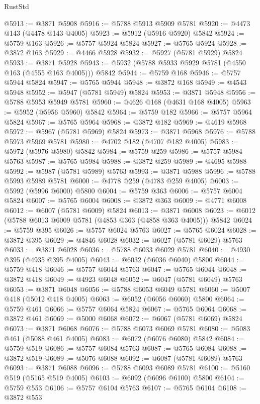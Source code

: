 \begin{lexlean}{RustStd}
\begin{coremodule}
@5913 := @3871 @5908
@5916 := @5788 @5913 @5909 @5781
@5920 := @4473 @143 (@4478 @143 @4005)
@5923 := @5912 (@5916 @5920) @5842
@5924 := @5759 @163
@5926 := @5757 @5924 @5824
@5927 := @5765 @5924
@5928 := @3872 @163
@5929 := @4466 @5928
@5932 := @5927 (@5781 @5929) @5824
@5933 := @3871 @5928
@5943 := @5932 (@5788 @5933 @5929 @5781 (@4550 @163 (@4555 @163 @4005))) @5842
@5944 := @5759 @168
@5946 := @5757 @5944 @5824
@5947 := @5765 @5944
@5948 := @3872 @168
@5949 := @4543 @5948
@5952 := @5947 (@5781 @5949) @5824
@5953 := @3871 @5948
@5956 := @5788 @5953 @5949 @5781
@5960 := @4626 @168 (@4631 @168 @4005)
@5963 := @5952 (@5956 @5960) @5842
@5964 := @5759 @182
@5966 := @5757 @5964 @5824
@5967 := @5765 @5964
@5968 := @3872 @182
@5969 := @4619 @5968
@5972 := @5967 (@5781 @5969) @5824
@5973 := @3871 @5968
@5976 := @5788 @5973 @5969 @5781
@5980 := @4702 @182 (@4707 @182 @4005)
@5983 := @5972 (@5976 @5980) @5842
@5984 := @5759 @259
@5986 := @5757 @5984 @5763
@5987 := @5765 @5984
@5988 := @3872 @259
@5989 := @4695 @5988
@5992 := @5987 (@5781 @5989) @5763
@5993 := @3871 @5988
@5996 := @5788 @5993 @5989 @5781
@6000 := @4778 @259 (@4783 @259 @4005)
@6003 := @5992 (@5996 @6000) @5800
@6004 := @5759 @363
@6006 := @5757 @6004 @5824
@6007 := @5765 @6004
@6008 := @3872 @363
@6009 := @4771 @6008
@6012 := @6007 (@5781 @6009) @5824
@6013 := @3871 @6008
@6023 := @6012 (@5788 @6013 @6009 @5781 (@4853 @363 (@4858 @363 @4005))) @5842
@6024 := @5759 @395
@6026 := @5757 @6024 @5763
@6027 := @5765 @6024
@6028 := @3872 @395
@6029 := @4846 @6028
@6032 := @6027 (@5781 @6029) @5763
@6033 := @3871 @6028
@6036 := @5788 @6033 @6029 @5781
@6040 := @4930 @395 (@4935 @395 @4005)
@6043 := @6032 (@6036 @6040) @5800
@6044 := @5759 @418
@6046 := @5757 @6044 @5763
@6047 := @5765 @6044
@6048 := @3872 @418
@6049 := @4923 @6048
@6052 := @6047 (@5781 @6049) @5763
@6053 := @3871 @6048
@6056 := @5788 @6053 @6049 @5781
@6060 := @5007 @418 (@5012 @418 @4005)
@6063 := @6052 (@6056 @6060) @5800
@6064 := @5759 @461
@6066 := @5757 @6064 @5824
@6067 := @5765 @6064
@6068 := @3872 @461
@6069 := @5000 @6068
@6072 := @6067 (@5781 @6069) @5824
@6073 := @3871 @6068
@6076 := @5788 @6073 @6069 @5781
@6080 := @5083 @461 (@5088 @461 @4005)
@6083 := @6072 (@6076 @6080) @5842
@6084 := @5759 @519
@6086 := @5757 @6084 @5763
@6087 := @5765 @6084
@6088 := @3872 @519
@6089 := @5076 @6088
@6092 := @6087 (@5781 @6089) @5763
@6093 := @3871 @6088
@6096 := @5788 @6093 @6089 @5781
@6100 := @5160 @519 (@5165 @519 @4005)
@6103 := @6092 (@6096 @6100) @5800
@6104 := @5759 @553
@6106 := @5757 @6104 @5763
@6107 := @5765 @6104
@6108 := @3872 @553

\end{coremodule}
\end{lexlean}
